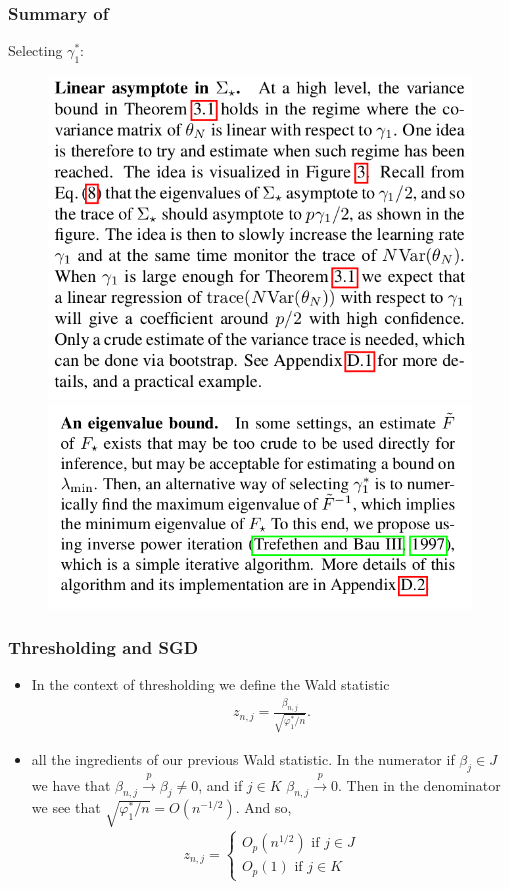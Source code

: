 \documentclass{beamer}
\newcommand{\inprob}{\overset{p}{\to}}
\begin{document}
\begin{frame}
  \frametitle{Summary of~\citet{chee:2023}}
  Selecting $\gamma_1^*$:
  \begin{figure}[h!]
    \centering
    \includegraphics[scale=0.25]{s1.png}
    \includegraphics[scale=0.25]{s2.png}
  \end{figure}
\end{frame}


\begin{frame}
  \frametitle{Thresholding and SGD}
  \begin{itemize}
  \item In the context of thresholding we define the Wald statistic
    \begin{align}
      z_{n,j} = \frac{\beta_{n,j}}{\sqrt{\varphi_1^* / n}}. \label{eq:pivot_sgd}
    \end{align}
  \item all the ingredients of our previous Wald statistic. In the numerator if $\beta_j \in J$ we have that $\beta_{n,j}\inprob \beta_j \ne 0$, and if $j \in K$ $\beta_{n,j}\inprob 0$. Then in the denominator we see that $\sqrt{\varphi_1^* / n} = O(n^{-1/2})$. And so,
\begin{align*}
  z_{n,j} = 
  \begin{cases}
    O_p(n^{1/2}) \text{ if } j\in J\\
    O_p(1) \text{ if } j\in K
  \end{cases}
\end{align*}
  \end{itemize}
\end{frame}
\end{document}
